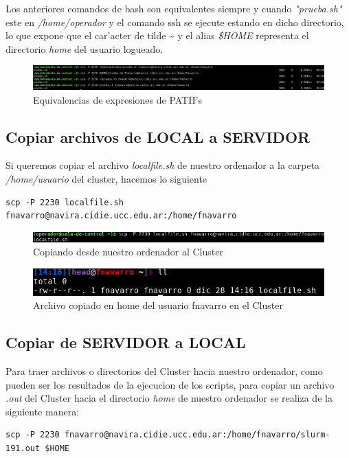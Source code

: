 \documentclass[a4paper]{scrartcl}
\newcommand{\BashFancyFormatLine}{%
  \def\FancyVerbFormatLine##1{\$\,##1}%
}
\begin{document}
Los anteriores comandos de bash son equivalentes siempre y cuando \textit{"prueba.sh"} este en \textit{/home/operador} y el comando ssh se ejecute estando en dicho directorio, lo que expone que el car'acter de tilde \textcolor{blue}{\textasciitilde} y el alias \textit{\$HOME} representa el directorio \textit{home} del usuario logueado.

\begin{figure}[ht]
	\includegraphics[width=\columnwidth]{./ssh_scp_sftp_imgs/samescp}
	\caption{Equivalencias de expresiones de PATH's}
	\label{fig:samescp}
\end{figure}

\subsection{Copiar archivos de LOCAL a SERVIDOR}
Si queremos copiar el archivo \textit{localfile.sh} de nuestro ordenador a la carpeta \textit{/home/usuario} del cluster, hacemos lo siguiente
\begin{verbatim}
scp -P 2230 localfile.sh fnavarro@navira.cidie.ucc.edu.ar:/home/fnavarro
\end{verbatim}

\begin{figure}[ht]
	\includegraphics[width=\columnwidth]{./ssh_scp_sftp_imgs/LtoS}
	\caption{Copiando desde nuestro ordenador al Cluster}
	\label{fig:LtoS}
\end{figure}

\begin{figure}[ht]
	\includegraphics[scale=0.5]{./ssh_scp_sftp_imgs/LtoS_A}
	\caption{Archivo copiado en home del usuario fnavarro en el Cluster}
	\label{fig:LtoS_A}
\end{figure}

\subsection{Copiar de SERVIDOR a LOCAL}
Para traer archivos o directorios del Cluster hacia nuestro ordenador, como pueden ser los resultados de la ejecucion de los scripts, para copiar un archivo \textit{.out} del Cluster hacia el directorio \textit{home} de nuestro ordenador se realiza de la siguiente manera:
\begin{verbatim}
scp -P 2230 fnavarro@navira.cidie.ucc.edu.ar:/home/fnavarro/slurm-191.out $HOME
\end{verbatim}
\end{document}
